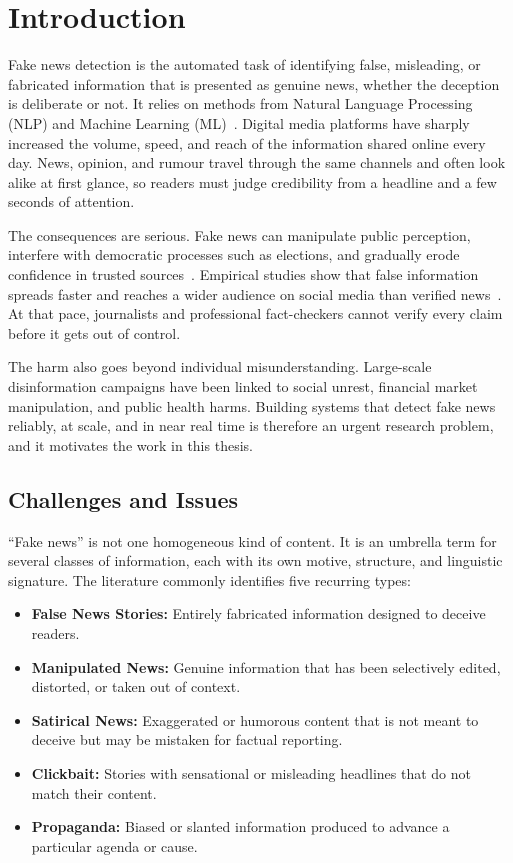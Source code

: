 \sloppy
\chapter{Introduction}

Fake news detection is the automated task of identifying false, misleading, or fabricated information that is presented as genuine news, whether the deception is deliberate or not. It relies on methods from Natural Language Processing (NLP) and Machine Learning (ML)~\citep{Shu2020FakeNewsNet,Shu2017FakeNewsDetection}. Digital media platforms have sharply increased the volume, speed, and reach of the information shared online every day. News, opinion, and rumour travel through the same channels and often look alike at first glance, so readers must judge credibility from a headline and a few seconds of attention.

The consequences are serious. Fake news can manipulate public perception, interfere with democratic processes such as elections, and gradually erode confidence in trusted sources~\citep{Shu2020FakeNewsNet,Shu2017FakeNewsDetection}. Empirical studies show that false information spreads faster and reaches a wider audience on social media than verified news~\citep{Vosoughi2018Spread}. At that pace, journalists and professional fact-checkers cannot verify every claim before it gets out of control.

The harm also goes beyond individual misunderstanding. Large-scale disinformation campaigns have been linked to social unrest, financial market manipulation, and public health harms. Building systems that detect fake news reliably, at scale, and in near real time is therefore an urgent research problem, and it motivates the work in this thesis.

\section{Challenges and Issues}

``Fake news'' is not one homogeneous kind of content. It is an umbrella term for several classes of information, each with its own motive, structure, and linguistic signature. The literature commonly identifies five recurring types:

\begin{itemize}
\item \textbf{False News Stories:} Entirely fabricated information designed to deceive readers.
\item \textbf{Manipulated News:} Genuine information that has been selectively edited, distorted, or taken out of context.
\item \textbf{Satirical News:} Exaggerated or humorous content that is not meant to deceive but may be mistaken for factual reporting.
\item \textbf{Clickbait:} Stories with sensational or misleading headlines that do not match their content.
\item \textbf{Propaganda:} Biased or slanted information produced to advance a particular agenda or cause.
\end{itemize}

